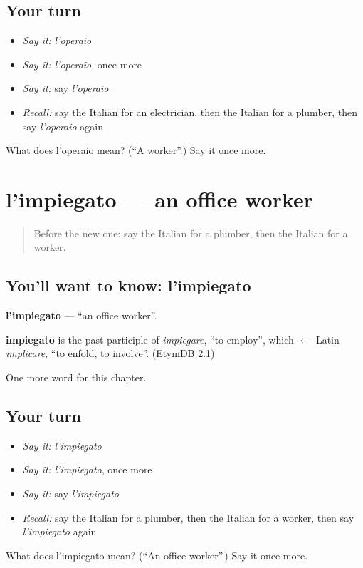 \subsection*{Your turn}
\begin{itemize}
\raggedright
  \item \emph{Say it:} \emph{l'operaio}
  \item \emph{Say it:} \emph{l'operaio}, once more
  \item \emph{Say it:} say \emph{l'operaio}
  \item \emph{Recall:} say the Italian for an electrician, then the Italian for a plumber, then say \emph{l'operaio} again
\end{itemize}

\begin{tcolorbox}[breakable,colback=teal!4,colframe=teal!35!black,title={Before you move on}]
What does l'operaio mean? (\textquotedblleft{}A worker\textquotedblright{}.) Say it once more.
\end{tcolorbox}
\section[l'impiegato]{l'impiegato — an office worker}

\label{lesson:IT-C163-impiegato}



\begin{quote}
Before the new one: say the Italian for a plumber, then the Italian for a worker.
\end{quote}

\subsection*{You'll want to know: l'impiegato}
\textbf{l'impiegato} — \textquotedblleft{}an office worker\textquotedblright{}.

\begin{cousinweb}
\textbf{impiegato} is the past participle of \emph{impiegare}, \textquotedblleft{}to employ\textquotedblright{}, which $\leftarrow$ Latin \emph{implicare}, \textquotedblleft{}to enfold, to involve\textquotedblright{}. (EtymDB 2.1)
\end{cousinweb}

\begin{grammarlens}[title={What you've built}]
One more word for this chapter.
\end{grammarlens}

\subsection*{Your turn}
\begin{itemize}
\raggedright
  \item \emph{Say it:} \emph{l'impiegato}
  \item \emph{Say it:} \emph{l'impiegato}, once more
  \item \emph{Say it:} say \emph{l'impiegato}
  \item \emph{Recall:} say the Italian for a plumber, then the Italian for a worker, then say \emph{l'impiegato} again
\end{itemize}

\begin{tcolorbox}[breakable,colback=teal!4,colframe=teal!35!black,title={Before you move on}]
What does l'impiegato mean? (\textquotedblleft{}An office worker\textquotedblright{}.) Say it once more.
\end{tcolorbox}
